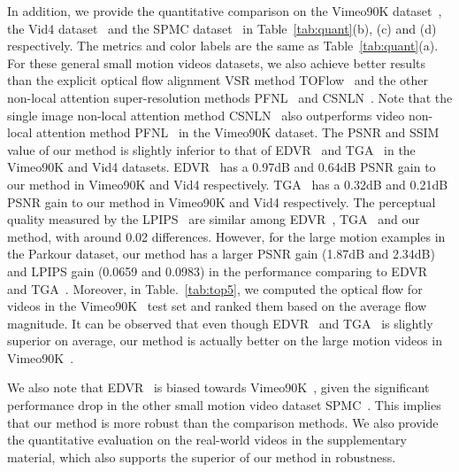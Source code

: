 In addition, we provide the quantitative comparison on the Vimeo90K dataset~\cite{vimeo90k}, the Vid4 dataset~\cite{frvsr} and the SPMC dataset~\cite{spmc} in Table~\ref{tab:quant}(b), (c) and (d) respectively.
The metrics and color labels are the same as Table~\ref{tab:quant}(a).
For these general small motion videos datasets, we also achieve better results than the explicit optical flow alignment VSR method TOFlow~\cite{vimeo90k} and the other non-local attention super-resolution methods PFNL~\cite{pfnl} and CSNLN~\cite{mei}.
Note that the single image non-local attention method CSNLN~\cite{mei} also outperforms video non-local attention method PFNL~\cite{pfnl} in the Vimeo90K dataset.
The PSNR and SSIM value of our method is slightly inferior to that of EDVR~\cite{edvr} and TGA~\cite{tga} in the Vimeo90K and Vid4 datasets.
EDVR~\cite{edvr} has a 0.97dB and 0.64dB PSNR gain to our method in Vimeo90K and Vid4 respectively.
TGA~\cite{tga} has a 0.32dB and 0.21dB PSNR gain to our method in Vimeo90K and Vid4 respectively.
The perceptual quality measured by the LPIPS~\cite{lpips} are similar among EDVR~\cite{edvr}, TGA~\cite{tga} and our method, with around 0.02 differences.
However, for the large motion examples in the Parkour dataset, our method has a larger PSNR gain (1.87dB and 2.34dB) and LPIPS gain (0.0659 and 0.0983) in the performance comparing to EDVR~\cite{edvr} and TGA~\cite{tga}.
Moreover, in Table.~\ref{tab:top5}, we computed the optical flow for videos in the Vimeo90K~\cite{vimeo90k} test set and ranked them based on the average flow magnitude.
It can be observed that even though EDVR~\cite{edvr} and TGA~\cite{tga} is slightly superior on average, our method is actually better on the large motion videos in Vimeo90K~\cite{vimeo90k}.

We also note that EDVR~\cite{edvr} is biased towards Vimeo90K~\cite{vimeo90k}, given the significant performance drop in the other small motion video dataset SPMC~\cite{spmc}. 
This implies that our method is more robust than the comparison methods.
We also provide the quantitative evaluation on the real-world videos in the supplementary material, which also supports the superior of our method in robustness.

